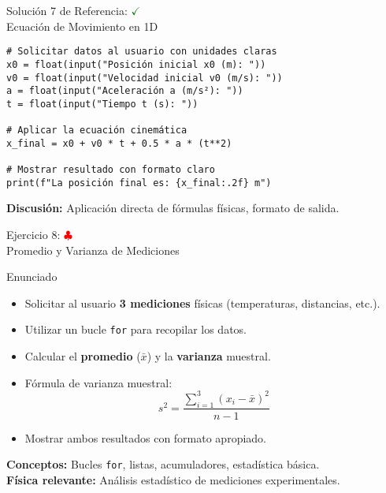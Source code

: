 \documentclass[10pt]{beamer}
\begin{document}
\begin{frame}[fragile]{Solución 7 de Referencia: \hfill \textcolor{green}{$\checkmark$} \\ Ecuación de Movimiento en 1D}
\begin{verbatim}
# Solicitar datos al usuario con unidades claras
x0 = float(input("Posición inicial x0 (m): "))
v0 = float(input("Velocidad inicial v0 (m/s): "))
a = float(input("Aceleración a (m/s²): "))
t = float(input("Tiempo t (s): "))

# Aplicar la ecuación cinemática
x_final = x0 + v0 * t + 0.5 * a * (t**2)

# Mostrar resultado con formato claro
print(f"La posición final es: {x_final:.2f} m")
\end{verbatim}
\textbf{Discusión:} Aplicación directa de fórmulas físicas, formato de salida.
\end{frame}

\begin{frame}{Ejercicio 8: \hfill \textcolor{red}{$\clubsuit$} \\ Promedio y Varianza de Mediciones}
  \begin{block}{Enunciado}
    \begin{itemize}
      \item Solicitar al usuario \textbf{3 mediciones} físicas (temperaturas, distancias, etc.).
      \item Utilizar un bucle \texttt{for} para recopilar los datos.
      \item Calcular el \textbf{promedio} (\(\bar{x}\)) y la \textbf{varianza} muestral.
      \item Fórmula de varianza muestral:
      \[
        s^2 = \frac{\sum_{i=1}^{3}(x_i - \bar{x})^2}{n - 1}
      \]
      \item Mostrar ambos resultados con formato apropiado.
    \end{itemize}
  \end{block}
  
  \textbf{Conceptos:} Bucles \texttt{for}, listas, acumuladores, estadística básica.
  \\
  \textbf{Física relevante:} Análisis estadístico de mediciones experimentales.
\end{frame}
\end{document}
